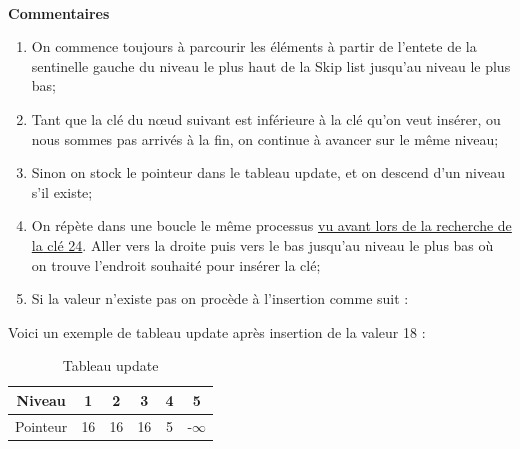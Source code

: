 \documentclass[hidelinks,a4paper,12pt]{article}
\begin{document}
~\\
\textbf {Commentaires} 
\begin{enumerate}
\item \hypertarget{EtapesInsertion}{\hyperlink{depart3}{}} On commence toujours à parcourir les éléments à partir de l'entete de la sentinelle gauche du niveau le plus haut de la Skip list jusqu'au niveau le plus bas;
\item Tant que la clé du nœud suivant est inférieure à la clé qu’on veut insérer, ou nous sommes pas arrivés à la fin, on continue à avancer sur le même niveau; 
\item Sinon on stock le pointeur dans le tableau update, et on descend d’un niveau s'il existe;
\item On répète dans une boucle le même processus \hypertarget{depart1}{\hyperlink{La recherche de 24}{vu avant lors de la recherche de la clé 24}}. 
Aller vers la droite puis vers le bas jusqu'au niveau le plus bas où on trouve l’endroit souhaité pour insérer la clé;
\item Si la valeur n'existe pas on procède à l'insertion comme suit :
\end{enumerate}

\newpage

Voici un exemple de tableau update après insertion de la valeur 18 : 
		
	\begin{table} [h]  
		\centering
		\begin{tabular}{|c|c|c|c|c|c|}
			\hline
			Niveau   & 1  & 2  & 3  & 4 & 5\\	
			\hline
			Pointeur & 16 & 16 & 16 & 5 & -$\infty$ \\	
			\hline
		\end{tabular}
		\caption{Tableau update} 
		\label{table:mytable}
	\end{table}
\end{document}
